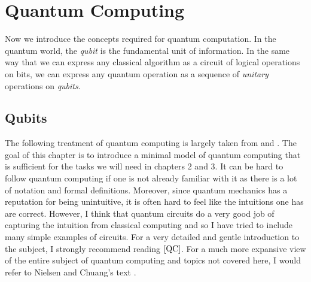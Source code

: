         
        





\section{Quantum Computing}
        Now we introduce the concepts required for quantum computation. In the quantum world, the \emph{qubit} is 
        the fundamental unit of information. In the same way that we can express any classical algorithm as a 
        circuit of logical operations on bits, we can express any quantum operation as a sequence of \emph{unitary} 
        operations on \emph{qubits}.
       
   \subsection{Qubits}

   The following treatment of quantum computing is largely taken from \cite{Nielsen&Chuang} and \cite{QC}. The goal 
   of this chapter is to introduce a minimal model of quantum computing that is sufficient for the tasks we will 
   need in chapters 2 and 3. It can be hard to follow quantum computing if one is not already familiar with it as 
   there is a lot of notation and formal definitions. Moreover, since quantum mechanics has a reputation for being 
   unintuitive, it is often hard to feel like the intuitions one has are correct.  However, I think that quantum 
   circuits do a very good job of capturing the intuition from classical computing and so I have tried to include 
   many simple examples of circuits. For a very detailed and gentle introduction to the subject, I strongly 
   recommend reading $\cite{QC}$. For a much more expansive view of the entire subject of quantum computing and 
   topics not covered here, I would refer to Nielsen and Chuang's text \cite{Nielsen&Chuang}.  
        
